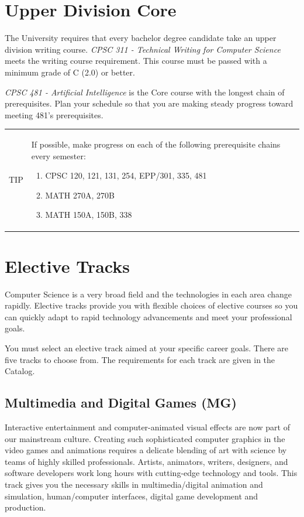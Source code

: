\documentclass{book}
\newenvironment{tip}{
  \tcolorbox \begin{tabular}{m{.5in} m{5in}} \Large{TIP} &
}{
  \end{tabular} \endtcolorbox
}
\newcommand{\mgtrackname}{Multimedia and Digital Games (MG)}
\begin{document}
\section{Upper Division Core}

The University requires that every bachelor degree candidate take an upper division writing course. \emph{CPSC 311 - Technical Writing for Computer Science} meets the writing course requirement. This course must be passed with a minimum grade of C (2.0) or better.

\emph{CPSC 481 - Artificial Intelligence} is the Core course with the longest chain of prerequisites. Plan your schedule so that you are making steady progress toward meeting 481's prerequisites.

\begin{tip}
  If possible, make progress on each of the following prerequisite chains every semester:
  \begin{enumerate}
  \item CPSC 120, 121, 131, 254, EPP/301, 335, 481
  \item MATH 270A, 270B
  \item MATH 150A, 150B, 338
  \end{enumerate}
\end{tip}

\section{Elective Tracks}
 
Computer Science is a very broad field and the technologies in each area change rapidly. Elective tracks provide you with flexible choices of elective courses so you can quickly adapt to rapid technology advancements and meet your professional goals.

You must select an elective track aimed at your specific career goals. There are five tracks to choose from. The requirements for each track are given in the Catalog.

\subsection{\mgtrackname}
\mgtrackindex
Interactive entertainment and computer-animated visual effects are now part of our mainstream culture. Creating such sophisticated computer graphics in the video games and animations requires a delicate blending of art with science by teams of highly skilled professionals. Artists, animators, writers, designers, and software developers work long hours with cutting-edge technology and tools. This track gives you the necessary skills in multimedia/digital animation and simulation, human/computer interfaces, digital game development and production.
\end{document}
